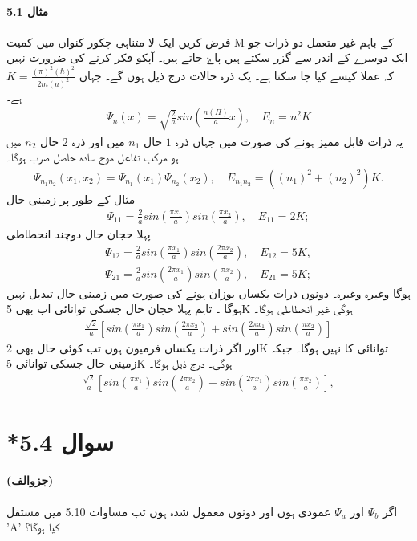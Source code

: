 \documentclass{book}
\begin{document}
\paragraph*{مثال 5.1}
فرض کریں ایک لا متناہی چکور کنواں میں کمیت M کے باہم غیر متعمل دو ذرات جو ایک دوسرے کے اندر سے گزر سکتے ہیں پاۓ جاتے ہیں۔ آپکو فکر کرنے کی ضرورت نہیں کہ عملا کیسے کیا جا سکتا ہے۔ یک ذرہ حالات درج ذیل ہوں گے۔ جہاں $ K=\frac{(\pi)^2 (\hbar)^2}{2m(a)^2 }
$
ہے۔
\begin{align}
 \Psi_{n} (x)=\sqrt{\frac{2}{a}}sin(\frac{n (\Pi)}{a}x), \quad E_{n}=n^2 K 
\end{align}
یہ ذرات قابل ممیز ہونے کی صورت میں جہاں ذرہ $ 1 $ حال   $ n_{1} $ میں اور ذرہ $ 2 $ حال $ n_{2} $  میں ہو مرکب تفاعل موج سادہ حاصل ضرب ہوگا۔
\begin{align}
 \Psi_{n_{1} n_{2}} (x_{1},x_{2})=\Psi_{n_{1}}(x_{1})\Psi_{n_{2}}(x_{2}), \quad E_{n_{1} n_{2}}= ((n_{1})^2+(n_{2})^2)K. 
\end{align}
مثال کے طور پر زمینی حال
\begin{align}
 \Psi_{11}=\frac{2}{a}sin(\frac{\pi x_{1}}{a}) sin(\frac{\pi x_{2}}{a}), \quad E_{11}=2K; 
\end{align}
پہلا حجان حال دوچند انحطاطی 
\begin{align}
 \Psi_{12}=\frac{2}{a}sin(\frac{\pi x_{1}}{a}) sin(\frac{2\pi x_{2}}{a}), \quad E_{12}=5K, \\
\Psi_{21}=\frac{2}{a}sin(\frac{2\pi x_{1}}{a}) sin(\frac{\pi x_{2}}{a}), \quad E_{21}=5K; 
\end{align}
ہوگا وغیرہ وغیرہ۔ دونوں ذرات یکساں بوزان ہونے کی صورت میں زمینی حال تبدیل نہیں ہوگا ۔ تاہم پہلا حجان حال جسکی توانائی اب بھی 5K ہوگی غیر انحطاطی ہوگا۔
\begin{align}
\frac{\sqrt{2}}{a}[sin(\frac{\pi x_{1}}{a})sin(\frac{2\pi x_{2}}{a})+ sin(\frac{2 \pi x_{1}}{a})sin(\frac{\pi x_{2}}{a})]
\end{align} 
اور اگر ذرات یکساں فرمیون ہوں تب کوئی حال بھی 2K توانائی کا نہیں ہوگا۔ جبکہ زمینی حال جسکی توانائی 5K ہوگی۔ درج ذیل ہوگا۔
\begin{align}
\frac{\sqrt{2}}{a}[sin(\frac{\pi x_{1}}{a}) sin(\frac{2 \pi x_{2}}{a})- sin(\frac{2 \pi x_{1}}{a}) sin(\frac{\pi x_{2}}{a})], 
\end{align}
\section*{*سوال 5.4}
\paragraph*{(جزوالف)}
اگر $ \Psi_{b} $ اور  $ \Psi_{a} $ عمودی ہوں اور دونوں معمول شدہ ہوں تب مساوات 5.10 میں مستقل 'A' کیا ہوگا؟ 
\end{document}

